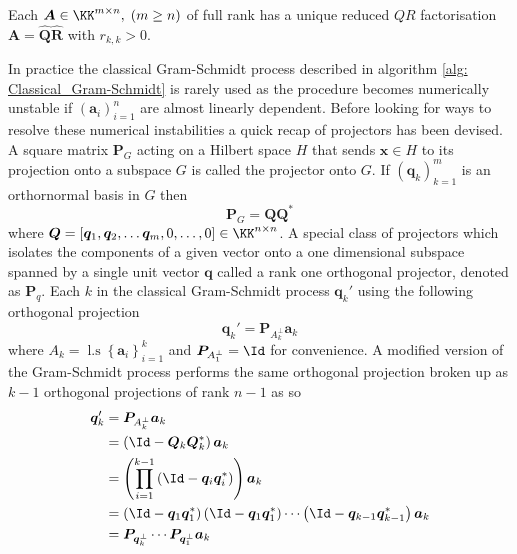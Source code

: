 \begin{thm} \label{theorem: QR_full_rank_unique}
    Each $\bm{A} \in \KK^{m \times n}, \; (m \geq n)$ of full rank has a unique reduced $QR$ factorisation $\bm{A} = \hat{\bm{Q}} \hat{\bm{R}}$ with $r_{k,k} > 0$.
    \cite{TrefethenLloydN.LloydNicholas1997Nla/}
\end{thm}

In practice the classical Gram-Schmidt process described in algorithm \ref{alg: Classical_Gram-Schmidt} is rarely used as the procedure becomes numerically unstable if $\left( \bm{a}_i \right)_{i=1}^{n}$ are almost linearly dependent. Before looking for ways to resolve these numerical instabilities a quick recap of projectors has been devised. A square matrix $\bm{P}_{G}$ acting on a Hilbert space $H$ that sends $\bm{x} \in H$ to its projection onto a subspace $G$ is called the projector onto $G$. If $\left( \bm{q}_k \right)_{k=1}^{m}$ is an orthornormal basis in $G$ then
\[
    \bm{P}_{G} = \bm{Q} \bm{Q}^{\ast}
\]
where $\bm{Q} = \left[ \bm{q}_1 , \bm{q}_2 , \ldots \bm{q}_m, 0 , \ldots , 0 \right] \in \KK^{n \times n}$. A special class of projectors which isolates the components of a given vector onto a one dimensional subspace spanned by a single unit vector $\bm{q}$ called a rank one orthogonal projector, denoted as $\bm{P}_{q}$. Each $k$ in the classical Gram-Schmidt process $\bm{q}_k'$ using the following orthogonal projection
\begin{equation}\label{eq: classical_GS_proj}
    \bm{q}_k' = \bm{P}_{A_{k}^{\perp}} \bm{a}_k
\end{equation}
where $A_k = \operatorname{l.s} \left\{ \bm{a}_i \right\}_{i=1}^{k}$ and $\bm{P}_{A_{1}^{\perp}} = \Id$ for convenience. A modified version of the Gram-Schmidt process performs the same orthogonal projection broken up as $k-1$ orthogonal projections of rank $n-1$ as so
\begin{align*}
    \bm{q}_k' & = \bm{P}_{A_{k}^{\perp}} \bm{a}_k                                                                                                                                   \\
              & = \left( \Id - \bm{Q}_{k} \bm{Q}_{k}^{\ast} \right) \bm{a}_k                                                                                                        \\
              & = \left( \prod_{i=1}^{k-1} \left( \Id - \bm{q}_i \bm{q}_i^{\ast} \right) \right)\bm{a}_k                                                                            \\
              & = \left( \Id - \bm{q}_1 \bm{q}_1^{\ast} \right) \left( \Id - \bm{q}_1 \bm{q}_1^{\ast} \right) \cdots \left( \Id - \bm{q}_{k-1} \bm{q}_{k-1}^{\ast} \right) \bm{a}_k \\
              & = \bm{P}_{\bm{q}_{k}^{\perp}} \cdots \bm{P}_{\bm{q}_{1}^{\perp}} \bm{a}_k
\end{align*}

